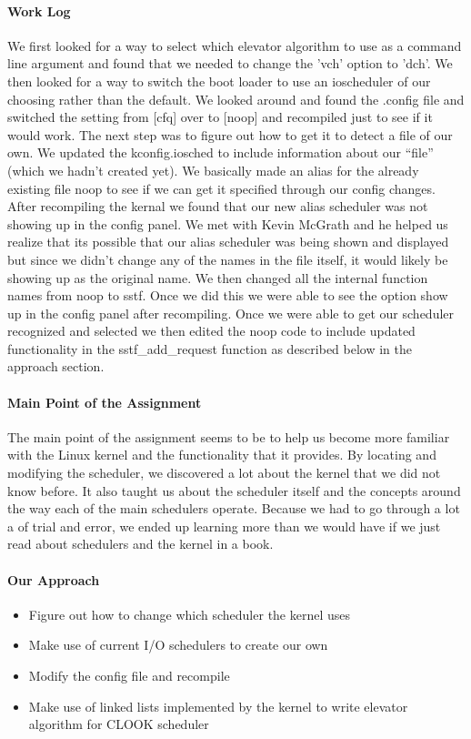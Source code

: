 \documentclass[titlepage,draftclsnofoot,onecolumn]{article}
\begin{document}
\paragraph{Work Log}
We first looked for a way to select which elevator algorithm to use as a command line argument and found that we needed to change the 'vch' option to 'dch'. We then looked for a way to switch the boot loader to use an ioscheduler of our choosing rather than the default. We looked around and found the .config file and switched the setting from [cfq] over to [noop] and recompiled just to see if it would work. The next step was to figure out how to get it to detect a file of our own. We updated the kconfig.iosched to include information about our “file” (which we hadn’t created yet). We basically made an alias for the already existing file noop to see if we can get it specified through our config changes. After recompiling the kernal we found that our new alias scheduler was not showing up in the config panel. We met with Kevin McGrath and he helped us realize that its possible that our alias scheduler was being shown and displayed but since we didn't change any of the names in the file itself, it would likely be showing up as the original name. We then changed all the internal function names from noop to sstf. Once we did this we were able to see the option show up in the config panel after recompiling. Once we were able to get our scheduler recognized and selected we then edited the noop code to include updated functionality in the sstf\_add\_request function as described below in the approach section.

\paragraph{Main Point of the Assignment}
The main point of the assignment seems to be to help us become more familiar with the Linux kernel and the functionality that it provides. By locating and modifying the scheduler, we discovered a lot about the kernel that we did not know before. It also taught us about the scheduler itself and the concepts around the way each of the main schedulers operate. Because we had to go through a lot a of trial and error, we ended up learning more than we would have if we just read about schedulers and the kernel in a book.

\paragraph{Our Approach}
\begin{itemize}
  \item Figure out how to change which scheduler the kernel uses
  \item Make use of current I/O schedulers to create our own
  \item Modify the config file and recompile
  \item Make use of linked lists implemented by the kernel to write elevator algorithm for CLOOK scheduler
  
\end{itemize}
\end{document}
